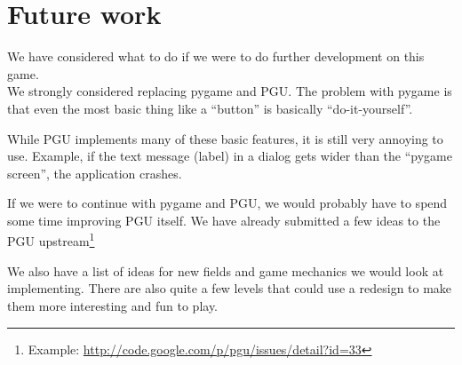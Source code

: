 \section{Future work}
We have considered what to do if we were to do further development
on this game.\\

We strongly considered replacing pygame and PGU.  The problem with
pygame is that even the most basic thing like a ``button'' is
basically ``do-it-yourself''.

While PGU implements many of these basic features, it is still very
annoying to use.  Example, if the text message (label) in a dialog
gets wider than the ``pygame screen'', the application crashes.

If we were to continue with pygame and PGU, we would probably have to
spend some time improving PGU itself.  We have already submitted a few
ideas to the PGU upstream\footnote{Example:
  \url{http://code.google.com/p/pgu/issues/detail?id=33}}

We also have a list of ideas for new fields and game mechanics we
would look at implementing.  There are also quite a few levels that
could use a redesign to make them more interesting and fun to play.

